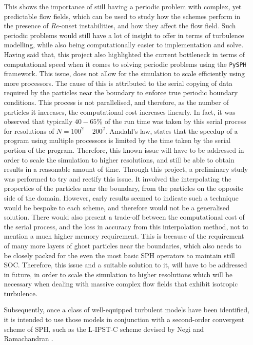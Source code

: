 This shows the importance of still having a periodic problem with complex, yet predictable flow fields, which can be used to study how the schemes perform in the presence of $Re$-onset instabilities, and how they affect the flow field. Such periodic problems would still have a lot of insight to offer in terms of turbulence modelling, while also being computationally easier to implementation and solve.
Having said that, this project also highlighted the current bottleneck in terms of computational speed when it comes to solving periodic problems using the \texttt{PySPH} framework. This issue, does not allow for the simulation to scale efficiently using more processors. The cause of this is attributed to the serial copying of data required by the particles near the boundary to enforce true periodic boundary conditions. This process is not parallelised, and therefore, as the number of particles it increases, the computational cost increases linearly. In fact, it was observed that typically $40-65\%$ of the run time was taken by this serial process for resolutions of $N = 100^2-200^2$. Amdahl's law, states that the speedup of a program using multiple processors is limited by the time taken by the serial portion of the program. Therefore, this known issue will have to be addressed in order to scale the simulation to higher resolutions, and still be able to obtain results in a reasonable amount of time.
Through this project, a preliminary study was performed to try and rectify this issue. It involved the interpolating the properties of the particles near the boundary, from the particles on the opposite side of the domain. However, early results seemed to indicate such a technique would be bespoke to each scheme, and therefore would not be a generalised solution. There would also present a trade-off between the computational cost of the serial process, and the loss in accuracy from this interpolation method, not to mention a much higher memory requirement. This is because of the requirement of many more layers of ghost particles near the boundaries, which also needs to be closely packed for the even the most basic SPH operators to maintain still SOC.
Therefore, this issue and a suitable solution to it, will have to be addressed in future, in order to scale the simulation to higher resolutions which will be necessary when dealing with massive complex flow fields that exhibit isotropic turbulence.






Subsequently, once a class of well-equipped turbulent models have been identified, it is intended to use those models in conjunction with a second-order convergent scheme of SPH, such as the L-IPST-C scheme devised by Negi and Ramachandran \parencite{Negi2022Techniques}. 

